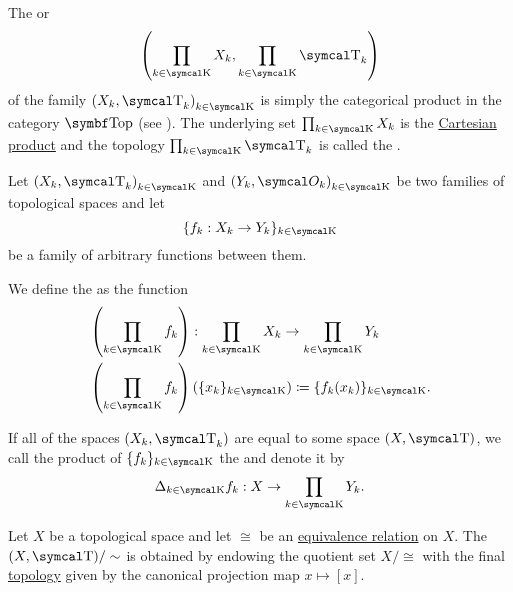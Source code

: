 \begin{Definition}\label{def:topological_product}
  The  or  
  \begin{equation*}
    \left( \prod_{k \in \CK} X_k, \prod_{k \in \CK} \CT_k \right)
  \end{equation*}
  of the family \( { (X_k, \CT_k) }_{k \in \CK} \) is simply the categorical product in the category \( \Cat{Top} \) (see ). The underlying set \( \prod_{k \in \CK} X_k \) is the \hyperref[thm:set_categorical_limits/product]{Cartesian product} and the topology \( \prod_{k \in \CK} \CT_k \) is called the .

  Let \( { (X_k, \CT_k) }_{k \in \CK} \) and \( { (Y_k, \Cal{O}_k) }_{k \in \CK} \) be two families of topological spaces and let
  \begin{equation*}
    \{ f_k: X_k \to Y_k \}_{k \in \CK}
  \end{equation*}
  be a family of arbitrary functions between them.

  We define the  as the function
  \begin{align*}
    &\left(\prod_{k \in \CK} f_k \right): \prod_{k \in \CK} X_k \to \prod_{k \in \CK} Y_k \\
    &\left(\prod_{k \in \CK} f_k \right)(\{ x_k \}_{k \in \CK}) \coloneqq \{ f_k (x_k) \}_{k \in \CK}.
  \end{align*}

  If all of the spaces \( (X_k, \CT_k) \) are equal to some space \( (X, \CT) \), we call the product of \( \{ f_k \}_{k \in \CK} \) the  and denote it by
  \begin{equation*}
    \Delta_{k \in \CK} f_k: X \to \prod_{k \in \CK} Y_k.
  \end{equation*}
\end{Definition}

\begin{Definition}\label{def:topological_quotient}\cite[90]{Engelking1989}
  Let \( X \) be a topological space and let \( \cong \) be an \hyperref[def:equivalence_relation]{equivalence relation} on \( X \). The  \( (X, \CT) / \sim \) is obtained by endowing the quotient set \( X / \cong \) with the final \hyperref[def:final_topology]{topology} given by the canonical projection map \( x \mapsto [x] \).
\end{Definition}

